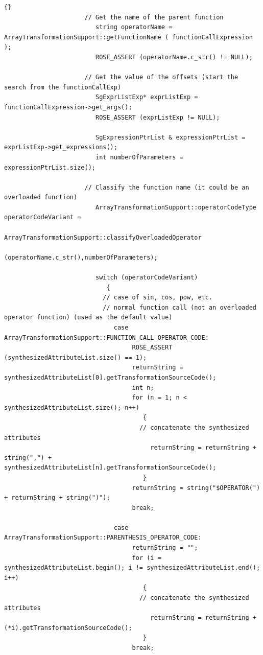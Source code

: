 \documentclass[10pt]{article}
\begin{document}
{\begin{lstlisting}{}
                      // Get the name of the parent function
                         string operatorName = ArrayTransformationSupport::getFunctionName ( functionCallExpression );
                         ROSE_ASSERT (operatorName.c_str() != NULL);

                      // Get the value of the offsets (start the search from the functionCallExp)
                         SgExprListExp* exprListExp = functionCallExpression->get_args();
                         ROSE_ASSERT (exprListExp != NULL);

                         SgExpressionPtrList & expressionPtrList = exprListExp->get_expressions();
                         int numberOfParameters = expressionPtrList.size();

                      // Classify the function name (it could be an overloaded function)
                         ArrayTransformationSupport::operatorCodeType operatorCodeVariant =
                              ArrayTransformationSupport::classifyOverloadedOperator
                                   (operatorName.c_str(),numberOfParameters);

                         switch (operatorCodeVariant)
                            {
                           // case of sin, cos, pow, etc.
                           // normal function call (not an overloaded operator function) (used as the default value)
                              case ArrayTransformationSupport::FUNCTION_CALL_OPERATOR_CODE:
                                   ROSE_ASSERT (synthesizedAttributeList.size() == 1);
                                   returnString = synthesizedAttributeList[0].getTransformationSourceCode();
                                   int n;
                                   for (n = 1; n < synthesizedAttributeList.size(); n++)
                                      {
                                     // concatenate the synthesized attributes
                                        returnString = returnString + string(",") + synthesizedAttributeList[n].getTransformationSourceCode();
                                      }
                                   returnString = string("$OPERATOR(") + returnString + string(")");
                                   break;

                              case ArrayTransformationSupport::PARENTHESIS_OPERATOR_CODE:
                                   returnString = "";
                                   for (i = synthesizedAttributeList.begin(); i != synthesizedAttributeList.end(); i++)
                                      {
                                     // concatenate the synthesized attributes
                                        returnString = returnString + (*i).getTransformationSourceCode();
                                      }
                                   break;


\end{lstlisting}}
\end{document}
